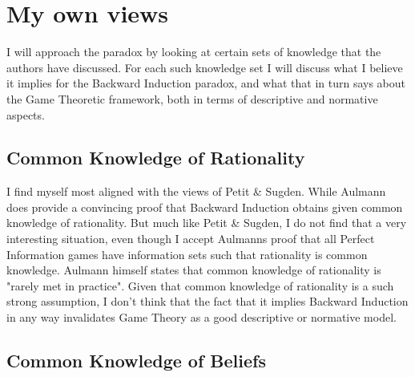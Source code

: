 \documentclass{article}
\begin{document}
\section{My own views}
I will approach the paradox by looking at certain sets of knowledge that the authors have discussed. For each such knowledge set I will discuss what I believe it implies for the Backward Induction paradox, and what that in turn says about the Game Theoretic framework, both in terms of descriptive and normative aspects.

\subsection{Common Knowledge of Rationality}

I find myself most aligned with the views of Petit \& Sugden. While Aulmann does provide a convincing proof that Backward Induction obtains given common knowledge of rationality. But much like Petit \& Sugden, I do not find that a very interesting situation, even though I accept Aulmanns proof that all Perfect Information games have information sets such that rationality is common knowledge. Aulmann himself states that common knowledge of rationality is "rarely met in practice". Given that common knowledge of rationality is a such strong assumption, I don't think that the fact that it implies Backward Induction in any way invalidates Game Theory as a good descriptive or normative model.

\subsection{Common Knowledge of Beliefs}


\subsubsection{}
\end{document}
